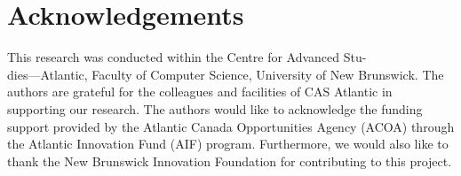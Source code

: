 \documentclass[sigconf]{acmart}
\begin{document}









\maketitle



















\section{Acknowledgements}

This research was conducted within the Centre for Advanced Stu-\\dies---Atlantic, Faculty of Computer Science, University of New Brunswick. The authors are grateful for the colleagues and facilities of CAS Atlantic in supporting our research. The authors would like to acknowledge the funding support provided by the Atlantic Canada Opportunities Agency (ACOA) through the Atlantic Innovation Fund (AIF) program. Furthermore, we would also like to thank the New Brunswick Innovation Foundation for contributing to this project.


{}
\end{document}
